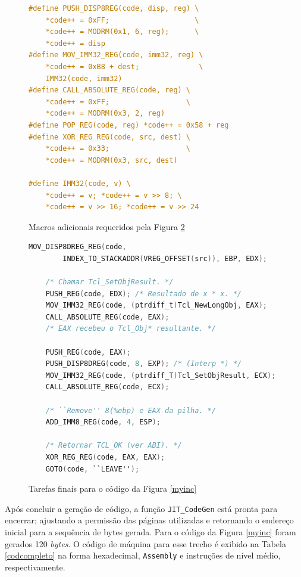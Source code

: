 \begin{figure}[ht!]
  \centering
  \begin{lstlisting}[language=C]
#define PUSH_DISP8REG(code, disp, reg) \
    *code++ = 0xFF;                    \
    *code++ = MODRM(0x1, 6, reg);      \
    *code++ = disp
#define MOV_IMM32_REG(code, imm32, reg) \
    *code++ = 0xB8 + dest;              \
    IMM32(code, imm32)
#define CALL_ABSOLUTE_REG(code, reg) \
    *code++ = 0xFF;                  \
    *code++ = MODRM(0x3, 2, reg)
#define POP_REG(code, reg) *code++ = 0x58 + reg
#define XOR_REG_REG(code, src, dest) \
    *code++ = 0x33;                  \
    *code++ = MODRM(0x3, src, dest)

#define IMM32(code, v) \
    *code++ = v; *code++ = v >> 8; \
    *code++ = v >> 16; *code++ = v >> 24
  \end{lstlisting}
  \caption{Macros adicionais requeridos pela Figura \ref{myinc-last}\label{myinc-last-macros}}
\end{figure}

\begin{figure}[ht!]
  \centering
  \begin{lstlisting}[language=C]
    MOV_DISP8DREG_REG(code,
        INDEX_TO_STACKADDR(VREG_OFFSET(src)), EBP, EDX);

    /* Chamar Tcl_SetObjResult. */
    PUSH_REG(code, EDX); /* Resultado de x * x. */
    MOV_IMM32_REG(code, (ptrdiff_t)Tcl_NewLongObj, EAX);
    CALL_ABSOLUTE_REG(code, EAX);
    /* EAX recebeu o Tcl_Obj* resultante. */

    PUSH_REG(code, EAX);
    PUSH_DISP8DREG(code, 8, EXP); /* (Interp *) */
    MOV_IMM32_REG(code, (ptrdiff_T)Tcl_SetObjResult, ECX);
    CALL_ABSOLUTE_REG(code, ECX);

    /* ``Remove'' 8(%ebp) e EAX da pilha. */
    ADD_IMM8_REG(code, 4, ESP);

    /* Retornar TCL_OK (ver ABI). */
    XOR_REG_REG(code, EAX, EAX);
    GOTO(code, ``LEAVE'');
  \end{lstlisting}
  \caption{Tarefas finais para o código da Figura \ref{myinc}\label{myinc-last}}
\end{figure}

Após concluir a geração de código, %
a função
\verb!JIT_CodeGen! está pronta para encerrar; ajustando a permissão
das páginas utilizadas e retornando
o endereço inicial para a sequência de bytes gerada. %
Para o código da Figura \ref{myinc} foram gerados 120 \textit{bytes}.
O código de máquina para esse trecho é exibido na Tabela
\ref{codcompleto} na forma hexadecimal, \texttt{Assembly} e instruções
de nível médio, respectivamente.

